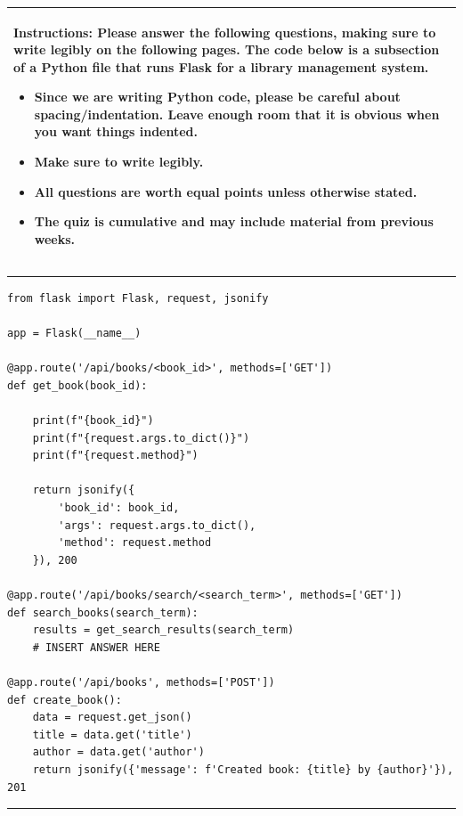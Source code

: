 \documentclass[11pt]{article}
\begin{document}
\begin{table}[h]
\centering
{} %
\begin{tabular}{|p{\textwidth}|}
\hline
\begin{minipage}[t]{\textwidth}
\vspace{0pt}  %
\noindent \textbf{Instructions:} Please answer the following questions, making sure to write legibly on the following pages. The code below is a subsection of a Python file that runs Flask for a library management system.
\begin{itemize}
\item Since we are writing Python code, please be careful about spacing/indentation. Leave enough room that it is obvious when you want things indented. 
\item Make sure to write legibly.
\item All questions are worth equal points unless otherwise stated.
\item The quiz is cumulative and may include material from previous weeks.
\end{itemize}
\end{minipage} 
\\
\hline
\end{tabular}
\end{table}

{\color{lightgray}\hrule}
\begin{verbatim}
from flask import Flask, request, jsonify

app = Flask(__name__)

@app.route('/api/books/<book_id>', methods=['GET'])
def get_book(book_id):
    
    print(f"{book_id}")
    print(f"{request.args.to_dict()}")
    print(f"{request.method}")
    
    return jsonify({
        'book_id': book_id,
        'args': request.args.to_dict(),
        'method': request.method
    }), 200

@app.route('/api/books/search/<search_term>', methods=['GET'])
def search_books(search_term):
    results = get_search_results(search_term)
    # INSERT ANSWER HERE

@app.route('/api/books', methods=['POST'])
def create_book():
    data = request.get_json()
    title = data.get('title')
    author = data.get('author')
    return jsonify({'message': f'Created book: {title} by {author}'}), 201

\end{verbatim}
{\color{lightgray}\hrule}
\end{document}
